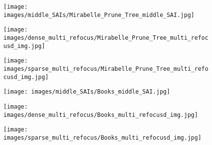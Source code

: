 \begin{figure*}[!p]
    \begin{subfigure}[t]{0.29\textwidth}
         \centering
         \texttt{[image: images/middle\_SAIs/Mirabelle\_Prune\_Tree\_middle\_SAI.jpg]}
     \end{subfigure}
     \hspace{0.1cm}
    \begin{subfigure}[t]{0.29\textwidth}
         \centering
         \texttt{[image: images/dense\_multi\_refocus/Mirabelle\_Prune\_Tree\_multi\_refocusd\_img.jpg]}
         \caption{}
         \label{fig:mirabelle_prune_tree}
     \end{subfigure}
     \hspace{0.1cm}
     \begin{subfigure}[t]{0.29\textwidth}
         \centering
         \texttt{[image: images/sparse\_multi\_refocus/Mirabelle\_Prune\_Tree\_multi\_refocusd\_img.jpg]}
     \end{subfigure}
    \vspace{.2cm}
     
    \begin{subfigure}[t]{0.29\textwidth}
         \centering
         \texttt{[image: images/middle\_SAIs/Books\_middle\_SAI.jpg]}
     \end{subfigure}
     \hspace{0.1cm}
    \begin{subfigure}[t]{0.29\textwidth}
         \centering
         \texttt{[image: images/dense\_multi\_refocus/Books\_multi\_refocusd\_img.jpg]}
         \caption{}
     \end{subfigure}
     \hspace{0.1cm}
     \begin{subfigure}[t]{0.29\textwidth}
         \centering
         \texttt{[image: images/sparse\_multi\_refocus/Books\_multi\_refocusd\_img.jpg]}
     \end{subfigure}
     
    \vspace{.2cm}
     

\end{figure*}
